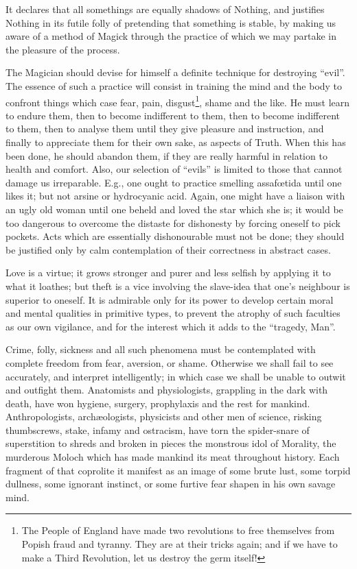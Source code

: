 It declares that all somethings are equally shadows of Nothing, and justifies Nothing in its futile folly of pretending that something is stable, by making us aware of a method of Magick through the practice of which we may partake in the pleasure of the process.

The Magician should devise for himself a definite technique for destroying \enquote{evil}. The essence of such a practice will consist in training the mind and the body to confront things which case fear, pain, disgust\footnote{The People of England have made two revolutions to free themselves from Popish fraud and tyranny. They are at their tricks again; and if we have to make a Third Revolution, let us destroy the germ itself!}, shame and the like. He must learn to endure them, then to become indifferent to them, then to become indifferent to them, then to analyse them until they give pleasure and instruction, and finally to appreciate them for their own sake, as aspects of Truth. When this has been done, he should abandon them, if they are really harmful in relation to health and comfort. Also, our selection of \enquote{evils} is limited to those that cannot damage us irreparable. E.g., one ought to practice smelling assaf\oe{}tida until one likes it; but not arsine or hydrocyanic acid. Again, one might have a liaison with an ugly old woman until one beheld and loved the star which she is; it would be too dangerous to overcome the distaste for dishonesty by forcing oneself to pick pockets. Acts which are essentially dishonourable must not be done; they should be justified only by calm contemplation of their correctness in abstract cases.

Love is a virtue; it grows stronger and purer and less selfish by applying it to what it loathes; but theft is a vice involving the slave-idea that one's neighbour is superior to oneself. It is admirable only for its power to develop certain moral and mental qualities in primitive types, to prevent the atrophy of such faculties as our own vigilance, and for the interest which it adds to the \enquote{tragedy, Man}.

Crime, folly, sickness and all such phenomena must be contemplated with complete freedom from fear, aversion, or shame. Otherwise we shall fail to see accurately, and interpret intelligently; in which case we shall be unable to outwit and outfight them. Anatomists and physiologists, grappling in the dark with death, have won hygiene, surgery, prophylaxis and the rest for mankind. Anthropologists, arch\ae{}ologists, physicists and other men of science, risking thumbscrews, stake, infamy and ostracism, have torn the spider-snare of superstition to shreds and broken in pieces the monstrous idol of Morality, the murderous Moloch which has made mankind its meat throughout history. Each fragment of that coprolite it manifest as an image of some brute lust, some torpid dullness, some ignorant instinct, or some furtive fear shapen in his own savage mind.

